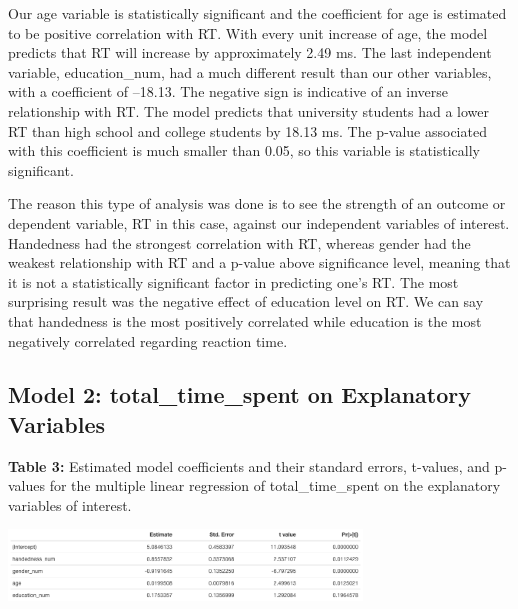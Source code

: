 \documentclass[
]{article}
\begin{document}
Our age variable is statistically significant and the coefficient for
age is estimated to be positive correlation with RT. With every unit
increase of age, the model predicts that RT will increase by
approximately 2.49 ms. The last independent variable, education\_num,
had a much different result than our other variables, with a coefficient
of --18.13. The negative sign is indicative of an inverse relationship
with RT. The model predicts that university students had a lower RT than
high school and college students by 18.13 ms. The p-value associated
with this coefficient is much smaller than 0.05, so this variable is
statistically significant.

The reason this type of analysis was done is to see the strength of an
outcome or dependent variable, RT in this case, against our independent
variables of interest. Handedness had the strongest correlation with RT,
whereas gender had the weakest relationship with RT and a p-value above
significance level, meaning that it is not a statistically significant
factor in predicting one's RT. The most surprising result was the
negative effect of education level on RT. We can say that handedness is
the most positively correlated while education is the most negatively
correlated regarding reaction time.

\hypertarget{model-2-total_time_spent-on-explanatory-variables}{%
\subsection{Model 2: total\_time\_spent on Explanatory
Variables}\label{model-2-total_time_spent-on-explanatory-variables}}

\textbf{Table 3:} Estimated model coefficients and their standard
errors, t-values, and p-values for the multiple linear regression of
total\_time\_spent on the explanatory variables of interest.

\begin{center}\includegraphics[width=3.7in]{Results_Model_2} \end{center}
\end{document}
